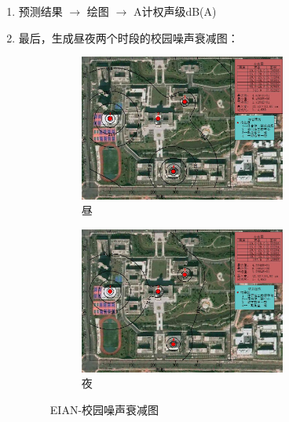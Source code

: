 \begin{enumerate}
    \item 预测结果 $\rightarrow $ 绘图 $\rightarrow $ A计权声级dB(A)

    \item 最后，生成昼夜两个时段的校园噪声衰减图：
    \begin{figure}[H]
        \centering
        \begin{subfigure}[h]{\textwidth}
            \centering
            \includegraphics[width=0.8\textwidth]{figures/Campus noise attenuation plot-daytime.jpg}
            \caption{昼}
        \end{subfigure}
        \hfill
        \begin{subfigure}[h]{\textwidth}
            \centering
            \includegraphics[width=0.8\textwidth]{figures/Campus noise attenuation plot-nighttime.jpg}
            \caption{夜}
        \end{subfigure}
        \caption{EIAN-校园噪声衰减图}
    \end{figure}
\end{enumerate}



